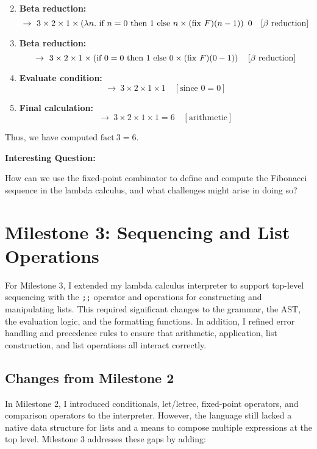 \documentclass{article}
\theoremstyle{theorem}
\theoremstyle{definition}
\theoremstyle{remark}
\begin{document}
\begin{enumerate}
\[    \]
    \item \textbf{Beta reduction:}
    \[    \rightarrow\ 3 \times 2 \times 1 \times \left( \lambda n.\ \text{if } n = 0\ \text{then}\ 1\ \text{else}\ n \times (\fix\ F)(n - 1) \right)\ 0 \quad [\beta\ \text{reduction}]
    \]
    \item \textbf{Beta reduction:}
    \[    \rightarrow\ 3 \times 2 \times 1 \times \left( \text{if } 0 = 0\ \text{then}\ 1\ \text{else}\ 0 \times (\mathrm{fix}\ F)(0 - 1) \right) \quad [\beta\ \text{reduction}]
    \]
    \item \textbf{Evaluate condition:}
    \[    \rightarrow\ 3 \times 2 \times 1 \times 1 \quad [\text{since } 0 = 0]
    \]
    \item \textbf{Final calculation:}
    \[    \rightarrow\ 3 \times 2 \times 1 \times 1 = 6 \quad [\text{arithmetic}]
    \]
\end{enumerate}

Thus, we have computed \(\text{fact}\ 3 = 6\).

\bigskip

\textbf{Interesting Question:}

How can we use the fixed-point combinator to define and compute the Fibonacci sequence in the lambda calculus, and what challenges might arise in doing so?

\section{Milestone 3: Sequencing and List Operations}

For Milestone 3, I extended my lambda calculus interpreter to support top-level sequencing with the \texttt{;;} operator and operations for constructing and manipulating lists. This required significant changes to the grammar, the AST, the evaluation logic, and the formatting functions. In addition, I refined error handling and precedence rules to ensure that arithmetic, application, list construction, and list operations all interact correctly.

\subsection{Changes from Milestone 2}

In Milestone 2, I introduced conditionals, let/letrec, fixed-point operators, and comparison operators to the interpreter. However, the language still lacked a native data structure for lists and a means to compose multiple expressions at the top level. Milestone 3 addresses these gaps by adding:
\end{document}
